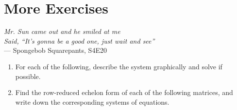 \documentclass[a4paper,leqno]{article}
\numberwithin{equation}{section}
\theoremstyle{definition}
\theoremstyle{remark}
\begin{document}
\section{More Exercises}
\begin{center}
  \emph{Mr. Sun came out and he smiled at me\\Said, ``It's gonna be a good one, just wait and see''}\\--- Spongebob Squarepants, S4E20
\end{center}
\begin{enumerate}
  \item For each of the following, describe the system graphically and solve if possible.
    \begin{center}
      \hspace*{\fill}
    \end{center}
  \item Find the row-reduced echelon form of each of the following matrices, and write down the corresponding systems of equations.
    \begin{center}

\end{center}
\end{enumerate}
\end{document}
